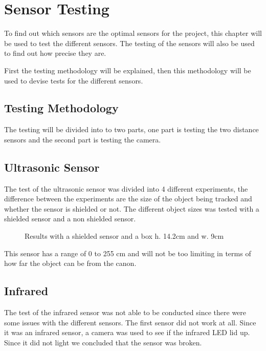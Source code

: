 \section{Sensor Testing}
To find out which sensors are the optimal sensors for the project,
this chapter will be used to test the different sensors. The testing of the
sensors will also be used to find out how precise they are.\nl

First the testing methodology will be explained, then this methodology
will be used to devise tests for the different sensors. 

\subsection{Testing Methodology}
The testing will be divided into to two parts, one part is testing the two
distance sensors and the second part is testing the camera. 

\subsection{Ultrasonic Sensor}
The test of the ultrasonic sensor was divided into 4 different experiments, the
difference between the experiments are the size of the object being tracked and
whether the sensor is shielded or not. The different object sizes was tested
with a shielded sensor and a non shielded sensor. \nl

\begin{figure}
\centering
{}
\caption{Results with a shielded sensor and a box h. 14.2cm and w. 9cm}
\end{figure}

This sensor has a range of 0 to 255 cm and will not be too limiting in terms of
how far the object can be from the canon. 

\subsection{Infrared}
The test of the infrared sensor was not able to be conducted since there were
some issues with the different sensors. The first sensor did not work at all.
Since it was an infrared sensor, a camera was used to see if the infrared
LED lid up. Since it did not light we concluded that the sensor was broken. \nl


